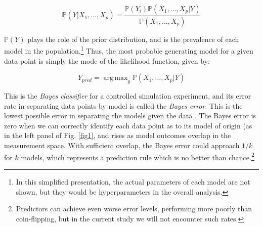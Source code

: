 \documentclass[10pt,letterpaper]{article}
\DeclareMathOperator*{\argmax}{arg\,max}
\begin{document}
\begin{equation}
\mathbb{P}(Y | X_1, \ldots, X_p) = \frac{\mathbb{P}(Y_i) \mathbb{P}(X_1, \ldots, X_p | Y)}{\mathbb{P}(X_1, \ldots, X_p)}
\label{eq:bayes-rule-classification}
\end{equation}

\(\mathbb{P}(Y)\) plays the role of the prior distribution, and is the
prevalence of each model in the population.\footnote{In this simplified presentation, the actual parameters of each model are not shown, but they would be hyperparameters in the overall analysis.}  Thus, the most probable generating model for a given data point is simply the mode of the likelihood function, given by:

\begin{equation}
Y_{pred} = \argmax_y \mathbb{P}(X_1, \ldots, X_p | Y)
\label{eq:map-class-bayes}
\end{equation}

This is the \emph{Bayes classifier} for a controlled simulation
experiment, and its error rate in separating data points by model is
called the \emph{Bayes error}. This is the lowest possible error in
separating the models given the data
\cite{devijver1982pattern, fukunaga1990introduction, hastie2009elements}.
The Bayes error is zero when we can correctly identify each data point
as to its model of origin (as in the left panel of Fig. \ref{fig1}, and rises as model outcomes overlap in the
measurement space. With sufficient overlap, the Bayes error could
approach $1/k$ for $k$ models, which represents a prediction rule which is no better than
chance.\footnote{Predictors can achieve even worse error levels, performing more poorly than coin-flipping, but in the current study we will not encounter such rates.}
\end{document}
